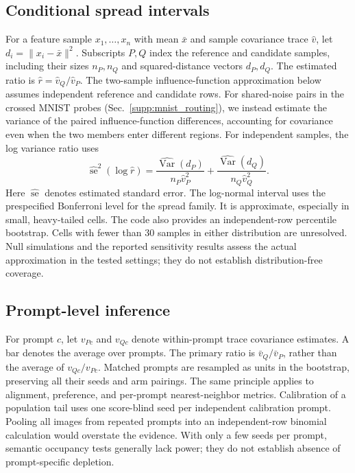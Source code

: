 \subsection{Conditional spread intervals}
For a feature sample $x_1,\ldots,x_n$ with mean $\bar x$ and sample
covariance trace $\hat v$, let $d_i=\|x_i-\bar x\|^2$.
Subscripts $P,Q$ index the reference and candidate samples, including
their sizes $n_P,n_Q$ and squared-distance vectors $d_P,d_Q$.
The estimated ratio is $\hat r=\hat v_Q/\hat v_P$.
The two-sample influence-function approximation
below assumes independent reference and candidate rows. For shared-noise
pairs in the crossed MNIST probes (Sec.~\ref{supp:mnist_routing}), we instead
estimate the variance of the paired influence-function differences, accounting
for covariance even when the two members enter different regions. For independent
samples, the log variance ratio uses
\begin{equation}
\widehat{\operatorname{se}}^2(\log\hat r)=
\frac{\widehat{\operatorname{Var}}(d_P)}{n_P\hat v_P^2}
+\frac{\widehat{\operatorname{Var}}(d_Q)}{n_Q\hat v_Q^2}.
\label{eq:supp_spread_se}
\end{equation}
Here $\widehat{\operatorname{se}}$ denotes estimated standard error.
The log-normal interval uses the prespecified Bonferroni level for the spread
family. It is approximate, especially in small, heavy-tailed cells. The code
also provides an independent-row percentile bootstrap. Cells with fewer than
30 samples in either distribution are unresolved. Null simulations and the
reported sensitivity results assess the actual approximation in the tested
settings; they do not establish distribution-free coverage.

\subsection{Prompt-level inference}
For prompt $c$, let $v_{Pc}$ and $v_{Qc}$ denote within-prompt trace covariance
estimates. A bar denotes the average over prompts. The primary ratio is
$\bar v_Q/\bar v_P$, rather than the average of $v_{Qc}/v_{Pc}$.
Matched prompts are resampled as units in the bootstrap, preserving all their
seeds and arm pairings. The same principle applies to alignment, preference,
and per-prompt nearest-neighbor metrics. Calibration of a population tail uses
one score-blind seed per independent calibration prompt. Pooling all images
from repeated prompts into an independent-row binomial calculation would
overstate the evidence. With only a few seeds per prompt, semantic occupancy
tests generally lack power; they do not establish absence of prompt-specific
depletion.

